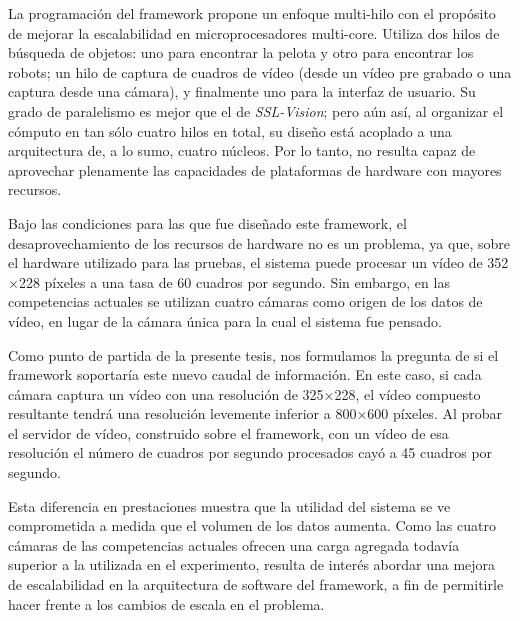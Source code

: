 La programación del framework propone un enfoque multi-hilo con el propósito de
mejorar la escalabilidad en microprocesadores multi-core. Utiliza dos hilos de
búsqueda de objetos: uno para encontrar la pelota y otro para encontrar los
robots; un hilo de captura de cuadros de vídeo (desde un vídeo pre grabado o una
captura desde una cámara), y finalmente uno para la interfaz de usuario. Su
grado de paralelismo es mejor que el de \emph{SSL-Vision}; pero aún así, al
organizar el cómputo en tan sólo cuatro hilos en total, su diseño está acoplado
a una arquitectura de, a lo sumo, cuatro núcleos. Por lo tanto, no resulta capaz
de aprovechar plenamente las capacidades de plataformas de hardware con mayores
recursos.

Bajo las condiciones para las que fue diseñado este framework, el
desaprovechamiento de los recursos de hardware no es un problema, ya que, sobre
el hardware utilizado para las pruebas, el sistema puede procesar un vídeo de
352$\times$228 píxeles a una tasa de 60 cuadros por segundo. Sin embargo, en las
competencias actuales se utilizan cuatro cámaras como origen de los datos de
vídeo, en lugar de la cámara única para la cual el sistema fue pensado.

Como punto de partida de la presente tesis, nos formulamos la pregunta de si el
framework soportaría este nuevo caudal de información. En este caso, si cada
cámara captura un vídeo con una resolución de 325$\times$228, el vídeo compuesto
resultante tendrá una resolución levemente inferior a 800$\times$600 píxeles.
Al probar el servidor de vídeo, construido sobre el framework, con un vídeo de
esa resolución el número de cuadros por segundo procesados cayó a 45 cuadros por
segundo.

Esta diferencia en prestaciones muestra que la utilidad del sistema se ve
comprometida a medida que el volumen de los datos aumenta. Como las cuatro
cámaras de las competencias actuales ofrecen una carga agregada todavía superior
a la utilizada en el experimento, resulta de interés abordar una mejora de
escalabilidad en la arquitectura de software del framework, a fin de permitirle
hacer frente a los cambios de escala en el problema.
